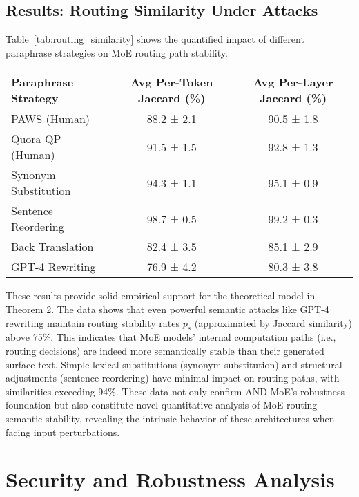 \documentclass[letterpaper,twocolumn,10pt]{article}
\begin{document}
\subsection{Results: Routing Similarity Under Attacks}

Table~\ref{tab:routing_similarity} shows the quantified impact of different paraphrase strategies on MoE routing path stability.

\begin{table*}[t]
\centering
\small
\begin{tabular}{|l|c|c|}
\hline
\textbf{Paraphrase Strategy} & \textbf{Avg Per-Token Jaccard (\%)} & \textbf{Avg Per-Layer Jaccard (\%)} \\
\hline
PAWS (Human) & 88.2 ± 2.1 & 90.5 ± 1.8 \\
Quora QP (Human) & 91.5 ± 1.5 & 92.8 ± 1.3 \\
Synonym Substitution & 94.3 ± 1.1 & 95.1 ± 0.9 \\
Sentence Reordering & 98.7 ± 0.5 & 99.2 ± 0.3 \\
Back Translation & 82.4 ± 3.5 & 85.1 ± 2.9 \\
GPT-4 Rewriting & 76.9 ± 4.2 & 80.3 ± 3.8 \\
\hline
\end{tabular}
\caption{Routing similarity under different paraphrase attacks. Higher similarity indicates greater preservation of routing paths after attacks. Results are mean ± standard deviation of 1000 samples.}
\label{tab:routing_similarity}
\end{table*}

These results provide solid empirical support for the theoretical model in Theorem 2. The data shows that even powerful semantic attacks like GPT-4 rewriting maintain routing stability rates $p_s$ (approximated by Jaccard similarity) above 75\%. This indicates that MoE models' internal computation paths (i.e., routing decisions) are indeed more semantically stable than their generated surface text. Simple lexical substitutions (synonym substitution) and structural adjustments (sentence reordering) have minimal impact on routing paths, with similarities exceeding 94\%. These data not only confirm AND-MoE's robustness foundation but also constitute novel quantitative analysis of MoE routing semantic stability, revealing the intrinsic behavior of these architectures when facing input perturbations.

\section{Security and Robustness Analysis}
\end{document}
